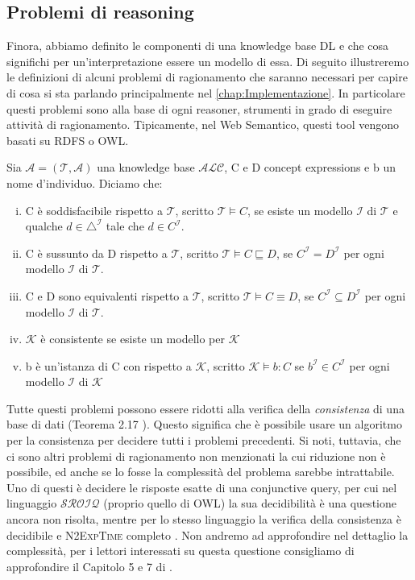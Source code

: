 \subsection[Problemi di reasoning]{Problemi di reasoning}
Finora, abbiamo definito le componenti di una knowledge base DL e che cosa significhi per un'interpretazione essere un modello di essa. Di seguito illustreremo le definizioni di alcuni problemi di ragionamento che saranno necessari per capire di cosa si sta parlando principalmente nel \autoref{chap:Implementazione}. In particolare questi problemi sono alla base di ogni reasoner, strumenti in grado di eseguire attività di ragionamento. Tipicamente, nel Web Semantico, questi tool vengono basati su RDFS o OWL.
\begin{definition}
	Sia $\mathcal{A} = (\mathcal{T}, \mathcal{A})$ una knowledge base $\mathcal{ALC}$, C e D concept expressions e b un nome d'individuo. Diciamo che:
	\begin{enumerate}[(i)]
		\item C è soddisfacibile rispetto a $\mathcal{T}$, scritto $\mathcal{T} \models C$, se esiste un modello $\mathcal{I}$ di $\mathcal{T}$ e qualche $d \in \triangle^\mathcal{I}$ tale che $d \in C^\mathcal{I}$.
		\item C è sussunto da D rispetto a $\mathcal{T}$, scritto $\mathcal{T} \models C \sqsubseteq D$, se $C^\mathcal{I} = D^\mathcal{I}$ per ogni modello $\mathcal{I}$ di $\mathcal{T}$.
		\item C e D sono equivalenti rispetto a $\mathcal{T}$, scritto $\mathcal{T} \models C \equiv D$, se $C^\mathcal{I} \subseteq D^\mathcal{I}$ per ogni modello $\mathcal{I}$ di $\mathcal{T}$.
		\item $\mathcal{K}$ è consistente se esiste un modello per $\mathcal{K}$
		\item b è un'istanza di C con rispetto a $\mathcal{K}$, scritto $\mathcal{K} \models b : C$ se $b^\mathcal{I} \in C^\mathcal{I}$ per ogni modello $\mathcal{I}$ di $\mathcal{K}$
	\end{enumerate}
\end{definition}
\noindent
Tutte questi problemi possono essere ridotti alla verifica della \textit{consistenza} di una base di dati (Teorema 2.17 \cite{baader2017introductionDL}). Questo significa che è possibile usare un algoritmo per la consistenza per decidere tutti i problemi precedenti. Si noti, tuttavia, che ci sono altri problemi di ragionamento non menzionati la cui riduzione non è possibile, ed anche se lo fosse la complessità del problema sarebbe intrattabile. Uno di questi è decidere le risposte esatte di una conjunctive query, per cui nel linguaggio $\mathcal{SROIQ}$ (proprio quello di OWL) la sua decidibilità è una questione ancora non risolta, mentre per lo stesso linguaggio la verifica della consistenza è decidibile e \textsc{N2ExpTime} completo \cite{baader2017introductionDL}. Non andremo ad approfondire nel dettaglio la complessità, per i lettori interessati su questa questione consigliamo di approfondire il Capitolo 5 e 7 di \cite{baader2017introductionDL}.

